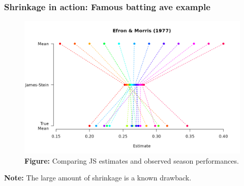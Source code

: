 \documentclass[18pt, handout]{beamer}
\begin{document}
\begin{frame}
\frametitle{Shrinkage in action: Famous batting ave example}
\vspace*{-.5\baselineskip}
\begin{figure}
\centering
\includegraphics[width=.9\linewidth]{Figure/batting_ave_example_viz}
\vspace*{-.5\baselineskip}
\caption*{\textcolor{themecolor}{\textbf{Figure:}}
	Comparing JS estimates and observed season performances.%
}%
\end{figure}

\vspace*{-.8\baselineskip}
\textbf{Note:} The large amount of shrinkage is a known drawback.
\end{frame}
\end{document}
